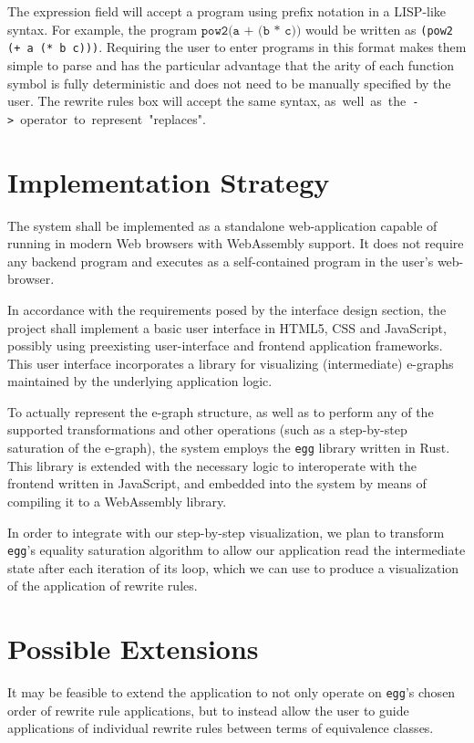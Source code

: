 \documentclass[letterpaper,twocolumn,10pt]{article}
\begin{document}
The expression field will accept a program using prefix notation in a LISP-like syntax. For example, the program $\texttt{pow2(a + (b * c))}$ would be written as \texttt{(pow2 (+ a (* b c)))}. Requiring the user to enter programs in this format makes them simple to parse and has the particular advantage that the arity of each function symbol is fully deterministic and does not need to be manually specified by the user. The rewrite rules box will accept the same syntax, \mbox{as well as the \texttt{->} operator to represent "replaces"}.

\section{Implementation Strategy}

The system shall be implemented as a standalone web-application capable of running in modern Web browsers with WebAssembly support. It does not require any backend program and executes as a self-contained program in the user's web-browser.

In accordance with the requirements posed by the interface design section, the project shall implement a basic user interface in HTML5, CSS and JavaScript, possibly using preexisting user-interface and frontend application frameworks. This user interface incorporates a library for visualizing (intermediate) e-graphs maintained by the underlying application logic.

To actually represent the e-graph structure, as well as to perform any of the supported transformations and other operations (such as a step-by-step saturation of the e-graph), the system employs the \texttt{egg} library written in Rust. This library is extended with the necessary logic to interoperate with the frontend written in JavaScript, and embedded into the system  by means of compiling it to a WebAssembly library.

In order to integrate with our step-by-step visualization, we plan to transform \texttt{egg}'s equality saturation algorithm to allow our application read the intermediate state after each iteration of its loop, which we can use to produce a visualization of the application of rewrite rules.

\section{Possible Extensions}

It may be feasible to extend the application to not only operate on \texttt{egg}'s chosen order of rewrite rule applications, but to instead allow the user to guide applications of individual rewrite rules between terms of equivalence classes.
\end{document}
